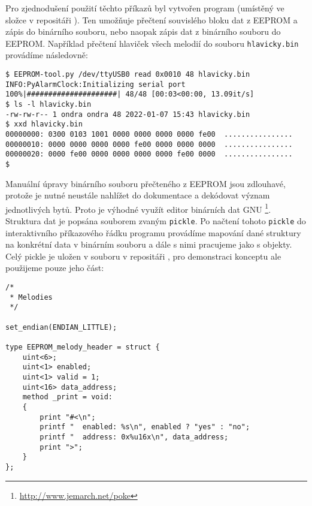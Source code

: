 Pro zjednodušení použití těchto příkazů byl vytvořen program
 (umístěný ve složce  v repositáři
). Ten umožňuje přečtení souvislého bloku dat z EEPROM
a zápis do binárního souboru, nebo naopak zápis dat z binárního souboru do
EEPROM. Například přečtení hlaviček všech melodií do souboru
\texttt{hlavicky.bin} provádíme následovně:
\begin{lstlisting}[style=terminal]
$ EEPROM-tool.py /dev/ttyUSB0 read 0x0010 48 hlavicky.bin
INFO:PyAlarmClock:Initializing serial port
100%|#####################| 48/48 [00:03<00:00, 13.09it/s]
$ ls -l hlavicky.bin
-rw-rw-r-- 1 ondra ondra 48 2022-01-07 15:43 hlavicky.bin
$ xxd hlavicky.bin
00000000: 0300 0103 1001 0000 0000 0000 0000 fe00  ................
00000010: 0000 0000 0000 0000 fe00 0000 0000 0000  ................
00000020: 0000 fe00 0000 0000 0000 0000 fe00 0000  ................
$
\end{lstlisting}

Manuální úpravy binárního souboru přečteného z EEPROM jsou zdlouhavé, protože
je nutné neustále nahlížet do dokumentace a dekódovat význam jednotlivých bytů.
Proto je výhodné využít editor binárních dat GNU
\footnote{\url{http://www.jemarch.net/poke}}.
Struktura dat je popsána souborem zvaným \texttt{pickle}. Po načtení tohoto
\texttt{pickle} do interaktivního příkazového řádku programu 
provádíme mapování dané struktury na konkrétní data v binárním souboru a dále
s nimi pracujeme jako s objekty. Celý pickle je uložen v souboru
 v repositáři , pro
demonstraci konceptu ale použijeme pouze jeho část:
\begin{lstlisting}[language=Poke]
/*
 * Melodies
 */

set_endian(ENDIAN_LITTLE);

type EEPROM_melody_header = struct {
    uint<6>;
    uint<1> enabled;
    uint<1> valid = 1;
    uint<16> data_address;
    method _print = void:
    {
        print "#<\n";
        printf "  enabled: %s\n", enabled ? "yes" : "no";
        printf "  address: 0x%u16x\n", data_address;
        print ">";
    }
};
\end{lstlisting}

